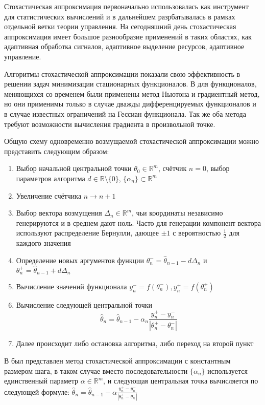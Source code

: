 Стохастическая аппроксимация первоначально использовалась как инструмент для статистических вычислений и в дальнейшем разрбатывалась в рамках отдельной ветки теории управления. На сегодняшний день стохастическая аппроксимация имеет большое разнообразие применений в таких областях, как адаптивная обработка сигналов, адаптивное выделение ресурсов, адаптивное управление.

Алгоритмы стохастической аппроксимации показали свою эффективность в решении задач минимизации стационарных функционалов. В \cite{Polyak:1987} для функционалов, меняющихся со временем были применены метод Ньютона и градиентный метод, но они применимы только в случае дважды дифференцируемых функционалов и в случае известных ограничений на Гессиан функционала. Так же оба метода требуют возможности вычисления градиента в произвольной точке.

Общую схему одновременно возмущаемой стохастической аппроксимации можно представить следующим образом:

\begin{enumerate}
	\item Выбор начальной центральной точки $\theta_0 \in \mathbb{R}^m$, счётчик $n = 0$, выбор параметров алгоритма $d \in \mathbb{R} \setminus \{0\}$, $\{\alpha_n\} \subset \mathbb{R}^m$
	\item Увеличение счётчика $n \rightarrow n + 1$
	\item Выбор вектора возмущения $\Delta_n \in \mathbb{R}^m$, чьи координаты независимо генерируются и в среднем дают ноль. Часто для генерации компонент вектора используют распределение Бернулли, дающее $\pm1$ с вероятностью $\frac{1}{2}$ для каждого значения
	\item Определение новых аргументов функции $\theta_{n}^{-}=\hat{\theta}_{n - 1} - d\Delta_{n}$ и $\theta_{n}^{+}=\hat{\theta}_{n - 1} + d\Delta_{n}$
	\item Вычисление значений функционала $y_n^{-} = f(\theta_{n}^{-}), y_n^{+} = f(\theta_{n}^{+})$
	\item Вычисление следующей центральной точки
	\begin{equation} \label{eq:spsa-central}
		\hat{\theta}_n = \hat{\theta}_{n - 1} - \alpha_n \frac{y_n^{+} - y_n^{-}}{|\theta_{n}^{+} - \theta_{n}^{-}|}
	\end{equation}
	\item Далее происходит либо остановка алгоритма, либо переход на второй пункт
\end{enumerate}

В \cite{Granichin&Amelina:2015} был представлен метод стохастической аппроксимации с константным размером шага, в таком случае вместо последовательности $\{\alpha_n\}$ используется единственный параметр $\alpha \in \mathbb{R}^m$, и следующая центральная точка вычисляется по следующей формуле: $\hat{\theta}_n = \hat{\theta}_{n - 1} - \alpha \frac{y_n^{+} - y_n^{-}}{|\theta_{n}^{+} - \theta_{n}^{-}|}$


